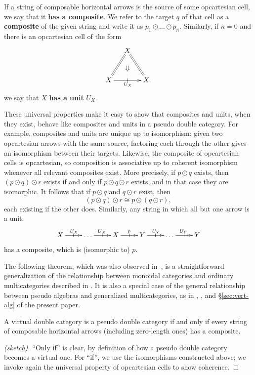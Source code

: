 \documentclass{tac}
\makeatletter
\newcommand{\iso}{\cong}
\numberwithin{equation}{section}
\def\currthmtype{}
\let\old@label\label
\def\label#1{%
    {\let\your@currentlabel\@currentlabel%
      \edef\@currentlabel{\currthmtype}%
      \old@label{label@name@#1}}%
    \old@label{#1}}
\makeatother
\begin{document}
If a string of composable horizontal arrows is the source of some opcartesian
cell, we say that it \textbf{has a composite}.  We refer to the
target $q$ of that cell as a \textbf{composite} of the given string
and write it as $p_1\odot\dots\odot p_n$.  Similarly, if $n=0$ and
there is an opcartesian cell of the form
\[\xymatrix@R=1pc@C=1pc{ &X \ar@{}[dd]|(.6){{\textstyle\Downarrow}}
  \ar@{=}[ddl]\ar@{=}[ddr]\\
  \\ X \ar[rr]|-@{|}_{U_X} && X.}
\]
we say that $X$ \textbf{has a unit} $U_X$.

These universal properties make it easy to show that composites and
units, when they exist, behave like composites and units in a pseudo
double category.  For example, composites and units are unique up to
isomorphism: given two opcartesian arrows with the same
source, factoring each through the other gives an isomorphism between
their targets.  Likewise, the composite of opcartesian cells is
opcartesian, so composition is associative up to coherent isomorphism
whenever all relevant composites exist.  More precisely, if $p\odot q$
exists, then $(p\odot q)\odot r$ exists if and only if $p\odot q\odot
r$ exists, and in that case they are isomorphic.  It follows that if
$p\odot q$ and $q\odot r$ exist, then
\[(p\odot q)\odot r \iso p\odot (q\odot r),
\]
each existing if the other does.  Similarly, any string in which
all but one arrow is a unit:
\[\xymatrix{X \ar[r]|-@{|}^{U_X} &
  \dots \ar[r]|-@{|}^{U_X} &
  X \ar[r]|-@{|}^p &
  Y \ar[r]|-@{|}^{U_Y} &
  \dots \ar[r]|-@{|}^{U_Y}  & Y}\]
has a composite, which is (isomorphic to) $p$.

The following theorem, which was also observed in~\cite{dpp:paths-dbl},
is a straightforward generalization of the relationship between monoidal
categories and ordinary multicategories described in
\cite{HermidaRepresentable}.  It is also a special case of the general
relationship between pseudo algebras and generalized multicategories, as
in \cite[\S6.6]{leinster:higher-opds}, \cite{HermidaCoherent}, and
\S\ref{sec:vert-alg} of the present paper.

\begin{theorem}\label{dblcatcharacterization}
  A virtual double category is a pseudo double category if and only if
  every string of composable horizontal arrows (including zero-length
  ones) has a composite.
\end{theorem}
\begin{proof}[(sketch)]
  ``Only if'' is clear, by definition of how a pseudo double category
  becomes a virtual one.  For ``if'', we use the isomorphisms
  constructed above; we invoke again the universal property of
  opcartesian cells to show coherence.
\end{proof}
\end{document}
